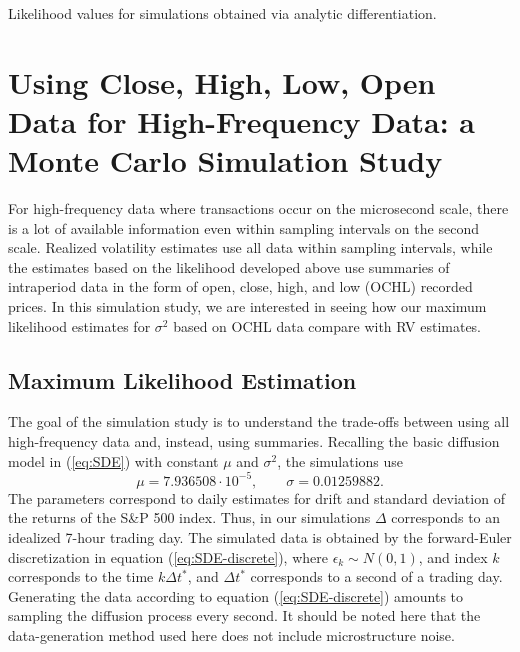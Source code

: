 \begin{table}
	\centering
	\caption{Likelihood values for simulations obtained via analytic differentiation. }
	\label{table:analytic}
\end{table}


\section{Using Close, High, Low, Open Data for High-Frequency Data: a Monte Carlo Simulation Study}
For high-frequency data where transactions occur on the microsecond scale, there is a lot of available information even within sampling intervals on the second scale. Realized volatility estimates use all data within sampling intervals, while the estimates based on the likelihood developed above use summaries of intraperiod data in the form of open, close, high, and low (OCHL) recorded prices. In this simulation study, we are interested in seeing how our maximum likelihood estimates for $\sigma^2$ based on OCHL data compare with RV estimates.

%
%
\subsection{Maximum Likelihood Estimation}
The goal of the simulation study is to understand the trade-offs between using all high-frequency data and, instead, using summaries. Recalling the basic diffusion model in (\ref{eq:SDE}) with constant $\mu$ and $\sigma^2$, the simulations use 
\[ \mu = 7.936508 \cdot 10^{-5}, \qquad \sigma = 0.01259882. \]
The parameters correspond to daily estimates for drift and standard deviation of the returns of the S\&P 500 index. Thus, in our simulations $\Delta$ corresponds to an idealized 7-hour trading day. The simulated data is obtained by the forward-Euler discretization in equation (\ref{eq:SDE-discrete}), where $\epsilon_k \sim N(0,1)$, and index $k$ corresponds to the time $k \Delta t^* $, and $\Delta t^*$ corresponds to a second of a trading day. Generating the data according to equation (\ref{eq:SDE-discrete}) amounts to sampling the diffusion process every second. It should be noted here that the data-generation method used here does not include microstructure noise.


